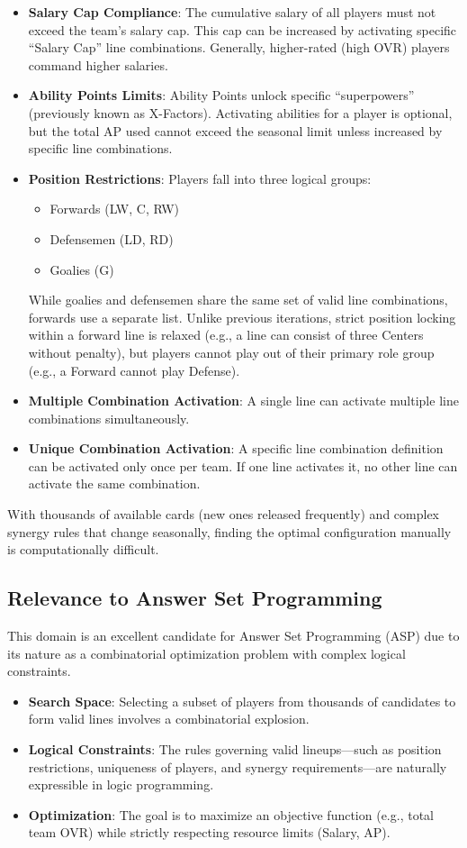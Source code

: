 \begin{itemize}
    \item \textbf{Salary Cap Compliance}: The cumulative salary of all players must not exceed the team's salary cap. This cap can be increased by activating specific ``Salary Cap'' line combinations. Generally, higher-rated (high OVR) players command higher salaries.
    \item \textbf{Ability Points Limits}: Ability Points unlock specific ``superpowers'' (previously known as X-Factors). Activating abilities for a player is optional, but the total AP used cannot exceed the seasonal limit unless increased by specific line combinations.
    \item \textbf{Position Restrictions}: Players fall into three logical groups:
    \begin{itemize}
        \item Forwards (LW, C, RW)
        \item Defensemen (LD, RD)
        \item Goalies (G)
    \end{itemize}
    While goalies and defensemen share the same set of valid line combinations, forwards use a separate list. Unlike previous iterations, strict position locking within a forward line is relaxed (e.g., a line can consist of three Centers without penalty), but players cannot play out of their primary role group (e.g., a Forward cannot play Defense).
    \item \textbf{Multiple Combination Activation}: A single line can activate multiple line combinations simultaneously.
    \item \textbf{Unique Combination Activation}: A specific line combination definition can be activated only once per team. If one line activates it, no other line can activate the same combination.
\end{itemize}

With thousands of available cards (new ones released frequently) and complex synergy rules that change seasonally, finding the optimal configuration manually is computationally difficult.

\subsection{Relevance to Answer Set Programming}
This domain is an excellent candidate for Answer Set Programming (ASP) due to its nature as a combinatorial optimization problem with complex logical constraints.
\begin{itemize}
    \item \textbf{Search Space}: Selecting a subset of players from thousands of candidates to form valid lines involves a combinatorial explosion.
    \item \textbf{Logical Constraints}: The rules governing valid lineups—such as position restrictions, uniqueness of players, and synergy requirements—are naturally expressible in logic programming.
    \item \textbf{Optimization}: The goal is to maximize an objective function (e.g., total team OVR) while strictly respecting resource limits (Salary, AP).
\end{itemize}

